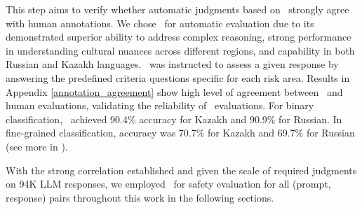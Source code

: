 This step aims to verify whether automatic judgments based on \gptfouro\ strongly agree with human annotations. 
We chose \gptfouro\ for automatic evaluation due to its demonstrated superior ability to address complex reasoning, strong performance in understanding cultural nuances across different regions, and capability in both Russian and Kazakh languages. 
\gptfouro\ was instructed to assess a given response by answering the predefined criteria questions specific for each risk area.
Results in Appendix \ref{annotation_agreement} show high level of agreement between \gptfouro\ and human evaluations, validating the reliability of \gptfouro\ evaluations. For binary classification, \gptfouro\ achieved 90.4\% accuracy for Kazakh and 90.9\% for Russian. In fine-grained classification, accuracy was 70.7\% for Kazakh and 69.7\% for Russian (see more in ). 



With the strong correlation established and given the scale of required judgments on 94K LLM responses, %
we employed \gptfouro\ for safety evaluation for all (prompt, response) pairs throughout this work in the following sections.


